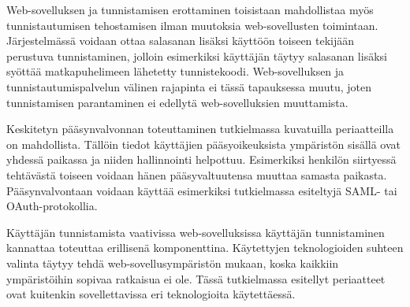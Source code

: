 Web-sovelluksen ja tunnistamisen erottaminen toisistaan mahdollistaa myös tunnistautumisen tehostamisen ilman muutoksia web-sovellusten toimintaan. Järjestelmässä voidaan ottaa salasanan lisäksi käyttöön toiseen tekijään perustuva tunnistaminen, jolloin esimerkiksi käyttäjän täytyy salasanan lisäksi syöttää matkapuhelimeen lähetetty tunnistekoodi. Web-sovelluksen ja tunnistautumispalvelun välinen rajapinta ei tässä tapauksessa muutu, joten tunnistamisen parantaminen ei edellytä web-sovelluksien muuttamista.

Keskitetyn pääsynvalvonnan toteuttaminen tutkielmassa kuvatuilla periaatteilla on mahdollista. Tällöin tiedot käyttäjien pääsyoikeuksista ympäristön sisällä ovat yhdessä paikassa ja niiden hallinnointi helpottuu. Esimerkiksi henkilön siirtyessä tehtävästä toiseen voidaan hänen pääsyvaltuutensa muuttaa samasta paikasta. Pääsynvalvontaan voidaan käyttää esimerkiksi tutkielmassa esiteltyjä SAML- tai OAuth-protokollia.

Käyttäjän tunnistamista vaativissa web-sovelluksissa käyttäjän tunnistaminen kannattaa toteuttaa erillisenä komponenttina. Käytettyjen teknologioiden suhteen valinta täytyy tehdä web-sovellusympäristön mukaan, koska kaikkiin ympäristöihin sopivaa ratkaisua ei ole. Tässä tutkielmassa esitellyt periaatteet ovat kuitenkin sovellettavissa eri teknologioita käytettäessä.